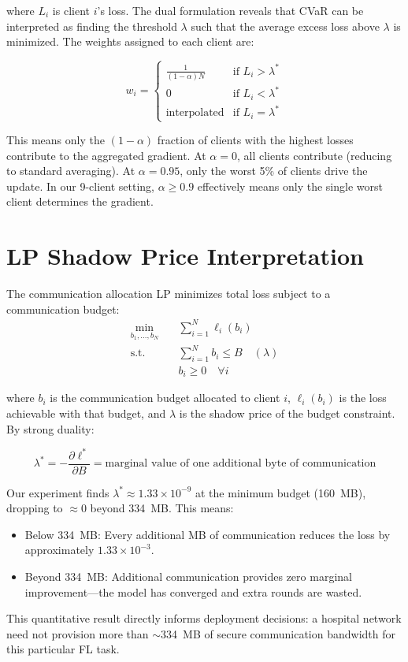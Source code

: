 \documentclass[11pt,a4paper]{report}
\begin{document}
where $L_i$ is client $i$'s loss. The dual formulation reveals that CVaR can be interpreted as finding the threshold $\lambda$ such that the average excess loss above $\lambda$ is minimized. The weights assigned to each client are:

\begin{equation}
w_i = \begin{cases}
\frac{1}{(1-\alpha)N} & \text{if } L_i > \lambda^* \\
0 & \text{if } L_i < \lambda^* \\
\text{interpolated} & \text{if } L_i = \lambda^*
\end{cases}
\end{equation}

This means only the $(1-\alpha)$ fraction of clients with the highest losses contribute to the aggregated gradient. At $\alpha=0$, all clients contribute (reducing to standard averaging). At $\alpha=0.95$, only the worst 5\% of clients drive the update. In our 9-client setting, $\alpha \geq 0.9$ effectively means only the single worst client determines the gradient.

\section{LP Shadow Price Interpretation}

The communication allocation LP minimizes total loss subject to a communication budget:
\begin{align}
\min_{b_1, \ldots, b_N} \quad & \sum_{i=1}^{N} \ell_i(b_i) \\
\text{s.t.} \quad & \sum_{i=1}^{N} b_i \leq B \quad (\lambda) \\
& b_i \geq 0 \quad \forall i
\end{align}

where $b_i$ is the communication budget allocated to client $i$, $\ell_i(b_i)$ is the loss achievable with that budget, and $\lambda$ is the shadow price of the budget constraint. By strong duality:

\begin{equation}
\lambda^* = -\frac{\partial \ell^*}{\partial B} = \text{marginal value of one additional byte of communication}
\end{equation}

Our experiment finds $\lambda^* \approx 1.33 \times 10^{-9}$ at the minimum budget (160~MB), dropping to $\approx 0$ beyond 334~MB. This means:
\begin{itemize}[leftmargin=2em]
\item Below 334~MB: Every additional MB of communication reduces the loss by approximately $1.33 \times 10^{-3}$.
\item Beyond 334~MB: Additional communication provides zero marginal improvement---the model has converged and extra rounds are wasted.
\end{itemize}

This quantitative result directly informs deployment decisions: a hospital network need not provision more than $\sim$334~MB of secure communication bandwidth for this particular FL task.
\end{document}
